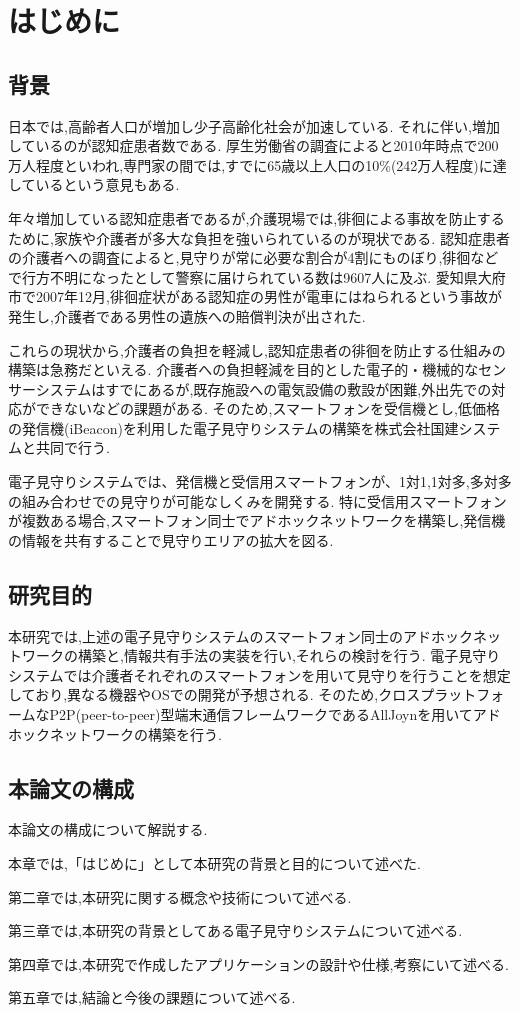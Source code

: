 \chapter{はじめに}
\label{chap:introduction}

\section{背景}
日本では,高齢者人口が増加し少子高齢化社会が加速している.
それに伴い,増加しているのが認知症患者数である.
厚生労働省の調査\cite{厚生労働省}によると2010年時点で200万人程度といわれ,専門家の間では,すでに65歳以上人口の10\%(242万人程度)に達しているという意見もある.

年々増加している認知症患者であるが,介護現場では,徘徊による事故を防止するために,家族や介護者が多大な負担を強いられているのが現状である.
認知症患者の介護者への調査\cite{山梨県}によると,見守りが常に必要な割合が4割にものぼり,徘徊などで行方不明になったとして警察に届けられている数は9607人に及ぶ.
愛知県大府市で2007年12月,徘徊症状がある認知症の男性が電車にはねられるという事故が発生し,介護者である男性の遺族への賠償判決が出された.

これらの現状から,介護者の負担を軽減し,認知症患者の徘徊を防止する仕組みの構築は急務だといえる.
介護者への負担軽減を目的とした電子的・機械的なセンサーシステムはすでにあるが,既存施設への電気設備の敷設が困難,外出先での対応ができないなどの課題がある.
そのため,スマートフォンを受信機とし,低価格の発信機(iBeacon)を利用した電子見守りシステムの構築を株式会社国建システムと共同で行う.

電子見守りシステムでは、発信機と受信用スマートフォンが、1対1,1対多,多対多の組み合わせでの見守りが可能なしくみを開発する.
特に受信用スマートフォンが複数ある場合,スマートフォン同士でアドホックネットワークを構築し,発信機の情報を共有することで見守りエリアの拡大を図る.

\section{研究目的}
本研究では,上述の電子見守りシステムのスマートフォン同士のアドホックネットワークの構築と,情報共有手法の実装を行い,それらの検討を行う.
電子見守りシステムでは介護者それぞれのスマートフォンを用いて見守りを行うことを想定しており,異なる機器やOSでの開発が予想される.
そのため,クロスプラットフォームなP2P(peer-to-peer)型端末通信フレームワークであるAllJoynを用いてアドホックネットワークの構築を行う.

\section{本論文の構成}
本論文の構成について解説する.

本章では,「はじめに」として本研究の背景と目的について述べた.

第二章では,本研究に関する概念や技術について述べる.

第三章では,本研究の背景としてある電子見守りシステムについて述べる.

第四章では,本研究で作成したアプリケーションの設計や仕様,考察にいて述べる.

第五章では,結論と今後の課題について述べる.
